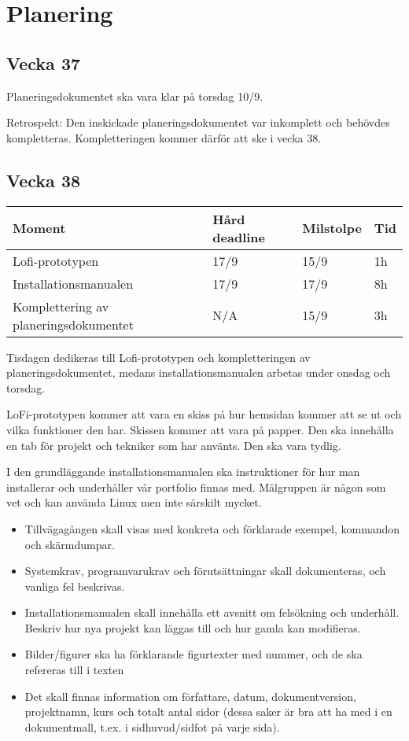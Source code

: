 \documentclass{TDP003mall}
\begin{document}
\newpage

\section{Planering}
\subsection*{Vecka 37}
Planeringsdokumentet ska vara klar på torsdag 10/9.

Retrospekt: Den inskickade planeringsdokumentet var inkomplett och behövdes kompletteras. Kompletteringen kommer därför att ske i vecka 38.

\subsection*{Vecka 38}
\begin{table}[!h]
\begin{tabularx}{\linewidth}{|X|l|l|l|}
\hline
Moment & Hård deadline & Milstolpe & Tid \\\hline
Lofi-prototypen & 17/9 & 15/9 & 1h \\\hline
Installationsmanualen & 17/9 & 17/9 & 8h \\\hline
Komplettering av planeringsdokumentet & N/A & 15/9 & 3h\\\hline
\end{tabularx}
\end{table}

Tisdagen dedikeras till Lofi-prototypen och kompletteringen av planeringsdokumentet, medans installationsmanualen arbetas under onsdag och torsdag.

LoFi-prototypen kommer att vara en skiss på hur hemsidan kommer att se ut och vilka funktioner den har. Skissen kommer att vara på papper. Den ska innehålla en tab för projekt och tekniker som har använts. Den ska vara tydlig.

I den grundläggande installationsmanualen ska instruktioner för hur man installerar och underhåller vår portfolio finnas med. Målgruppen är någon som vet och kan använda Linux men inte särskilt mycket.

\begin{itemize}
\item
  Tillvägagången skall visas med konkreta och förklarade exempel, kommandon och skärmdumpar.
\item	
  Systemkrav, programvarukrav och förutsättningar skall dokumenteras, och vanliga fel beskrivas.
\item	
  Installationsmanualen skall innehålla ett avsnitt om felsökning och underhåll. Beskriv hur nya projekt kan läggas till och hur gamla kan modifieras.
\item	
  Bilder/figurer ska ha förklarande figurtexter med nummer, och de ska refereras till i texten
\item	
  Det skall finnas information om författare, datum, dokumentversion, projektnamn, kurs och totalt antal sidor (dessa saker är bra att ha med i en dokumentmall, t.ex. i sidhuvud/sidfot på varje sida). 
\end{itemize}
\end{document}
